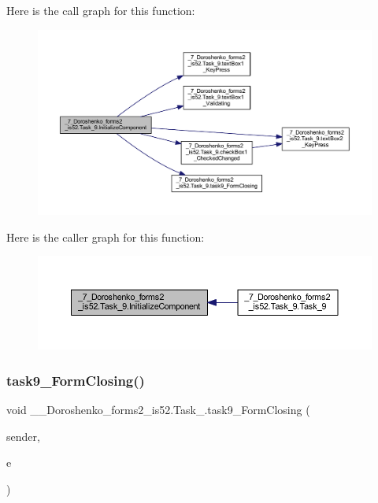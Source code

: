 Here is the call graph for this function\+:
\nopagebreak
\begin{figure}[H]
\begin{center}
\leavevmode
\includegraphics[width=350pt]{class__7___doroshenko__forms2__is52_1_1_task__9_aa49b500c1ab2cab10eb0e298c86bd3f7_cgraph}
\end{center}
\end{figure}
Here is the caller graph for this function\+:
\nopagebreak
\begin{figure}[H]
\begin{center}
\leavevmode
\includegraphics[width=350pt]{class__7___doroshenko__forms2__is52_1_1_task__9_aa49b500c1ab2cab10eb0e298c86bd3f7_icgraph}
\end{center}
\end{figure}
\hypertarget{class__7___doroshenko__forms2__is52_1_1_task__9_af51986ccc846ac91671650739e1764a3}{}\label{class__7___doroshenko__forms2__is52_1_1_task__9_af51986ccc846ac91671650739e1764a3} 
\subsubsection{\texorpdfstring{task9\+\_\+\+Form\+Closing()}{task9\_FormClosing()}}
{\footnotesize\ttfamily void \+\_\+\_\+\+Doroshenko\+\_\+forms2\+\_\+is52.\+Task\+\_.\+task9\+\_\+\+Form\+Closing (\begin{DoxyParamCaption}\item[{object}]{sender,  }\item[{Form\+Closing\+Event\+Args}]{e }\end{DoxyParamCaption})\hspace{0.3cm}{\ttfamily [private]}}

